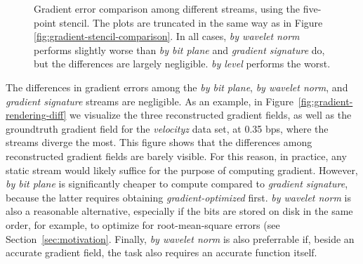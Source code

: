 \begin{figure}[h]
	\caption{Gradient error comparison among different streams, using the five-point stencil. The
	plots are truncated in the same way as in Figure \ref{fig:gradient-stencil-comparison}. In all
	cases, \emph{by wavelet norm} performs slightly worse than \emph{by bit plane} and \emph{gradient
	signature} do, but the differences are largely negligible. \emph{by level} performs the worst.}
	\label{fig:gradient-error-comparison}
\end{figure}

The differences in gradient errors among the \emph{by bit plane}, \emph{by wavelet norm}, and
\emph{gradient signature} streams are negligible. As an example, in
Figure~\ref{fig:gradient-rendering-diff} we visualize the three reconstructed gradient fields, as
well as the groundtruth gradient field for the \emph{velocityz} data set, at 0.35 bps, where the
streams diverge the most. This figure shows that the differences among reconstructed gradient fields
are barely visible. For this reason, in practice, any static stream would likely suffice for the
purpose of computing gradient. However, \emph{by bit plane} is significantly cheaper to compute
compared to \emph{gradient signature}, because the latter requires obtaining
\emph{gradient-optimized} first. \emph{by wavelet norm} is also a reasonable alternative, especially
if the bits are stored on disk in the same order, for example, to optimize for root-mean-square
errors (see Section~\ref{sec:motivation}. Finally, \emph{by wavelet norm} is also preferrable if,
beside an accurate gradient field, the task also requires an accurate function itself.

